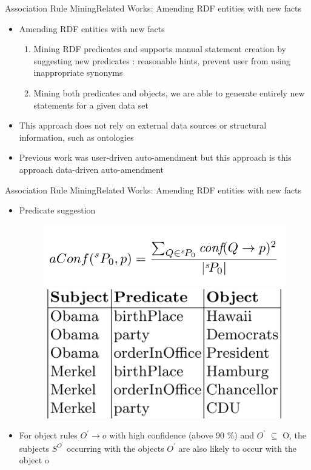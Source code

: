 \documentclass[10pt]{beamer}
\begin{document}
\begin{frame}{Association Rule Mining}{Related Works:  Amending RDF entities with new facts}
\begin{itemize}
\item Amending RDF entities with new facts \cite{abedjan2014amending}
	\begin{enumerate}
		\item Mining RDF predicates and supports manual statement creation by suggesting new predicates : reasonable hints, prevent user from using inappropriate synonyms 
		\item Mining both predicates and objects, we are able to generate entirely new statements for a given data set
	 

	\end{enumerate}
	\item This approach does not rely on external data sources or structural information, such as ontologies
	\item  Previous work \cite{abedjan2013improving} was user-driven auto-amendment but this approach is this approach data-driven auto-amendment
\end{itemize}
\end{frame}



\begin{frame}{Association Rule Mining}{Related Works:  Amending RDF entities with new facts}
	\begin{itemize}
	\item Predicate suggestion
		\begin{figure} 
		 \includegraphics[width=.5\linewidth]{images/suggestion-formula.PNG}
			\includegraphics[width=.4\linewidth]{images/predicate-suggestion.PNG}
		\end{figure}
	\item For object rules $O^\prime \rightarrow o$ with high confidence (above 90 $\%$) and $O^\prime$ $ \subseteq$ O, the subjects  $S^{O^\prime} $	occurring with the objects $O^\prime$ are also likely to occur with the	object o

\end{itemize}
\end{frame}
\end{document}
